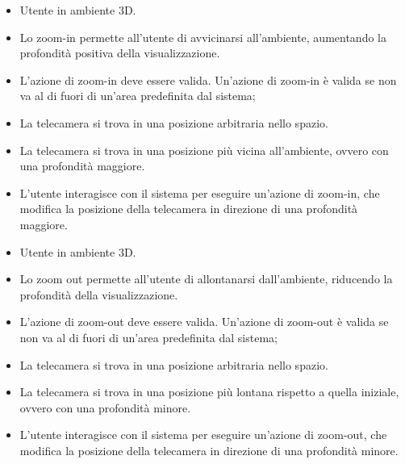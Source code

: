 \UCdsc
{ %
    \begin{itemize}
        \item Utente in ambiente 3D.
    \end{itemize}
}
{ %
    \begin{itemize}
        \item Lo zoom-in permette all'utente di avvicinarsi all'ambiente, aumentando la profondità positiva della visualizzazione.
    \end{itemize}
}
{ %
    \begin{itemize}
        \item L'azione di zoom-in deve essere valida. Un'azione di zoom-in è valida se non va al di fuori di un'area predefinita dal sistema;
        \item La telecamera si trova in una posizione arbitraria nello spazio.
    \end{itemize}
}
{ %
    \begin{itemize}
        \item La telecamera si trova in una posizione più vicina all'ambiente, ovvero con una profondità maggiore.
    \end{itemize}
}
{ %
    \begin{itemize}
        \item L'utente interagisce con il sistema per eseguire un'azione di zoom-in, che modifica la posizione della telecamera in direzione di una profondità maggiore.
    \end{itemize}
} 

\UCdsc
{ %
    \begin{itemize}
        \item Utente in ambiente 3D.
    \end{itemize}
}
{ %
    \begin{itemize}
        \item Lo zoom out permette all'utente di allontanarsi dall'ambiente, riducendo la profondità della visualizzazione.
    \end{itemize}
}
{ %
    \begin{itemize}
        \item L'azione di zoom-out deve essere valida. Un'azione di zoom-out è valida se non va al di fuori di un'area predefinita dal sistema;
        \item La telecamera si trova in una posizione arbitraria nello spazio.
    \end{itemize}
}
{ %
    \begin{itemize}
        \item La telecamera si trova in una posizione più lontana rispetto a quella iniziale, ovvero con una profondità minore.
    \end{itemize}
}
{ %
    \begin{itemize}
        \item L'utente interagisce con il sistema per eseguire un'azione di zoom-out, che modifica la posizione della telecamera in direzione di una profondità minore.
    \end{itemize}
} 

